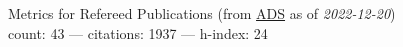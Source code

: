 Metrics for Refereed Publications (from \href{\adsurl}{ADS} as of \textit{2022-12-20}) \\count: 43 --- citations: 1937 --- h-index: 24